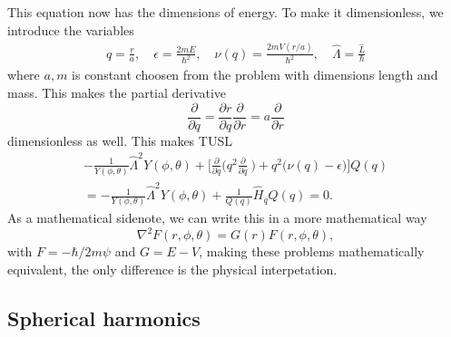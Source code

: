 \documentclass{article}
\begin{document}
        This equation now has the dimensions of energy. To make it dimensionless, we introduce the variables
        \begin{align*}
            q = \frac{r}{a}, \quad \epsilon = \frac{2mE}{\hbar^2}, \quad \nu(q) = \frac{2mV(r / a)}{\hbar^2}, \quad \hat \Lambda = \frac{\hat L}{\hbar} 
        \end{align*}
        where \(a, m\) is constant choosen from the problem with dimensions length and mass. This makes the partial derivative
        \begin{equation*}
            \frac{\partial}{\partial q} = \frac{\partial r}{\partial q} \frac{\partial}{\partial r} = a \frac{\partial }{\partial r}
        \end{equation*}
        dimensionless as well. This makes TUSL
        \begin{align}
            \label{dimensionless TUSL}
            \nonumber -\frac{1}{Y(\phi, \theta)}{\hat \Lambda}^2 Y(\phi, \theta) + \bigg[\frac{\partial}{\partial q}\bigg(q^2 \frac{\partial}{\partial q}\ \bigg) + q^2 \big(\nu(q) - \epsilon \big) \bigg] Q(q) \\
            = -\frac{1}{Y(\phi, \theta)}{\hat \Lambda}^2 Y(\phi, \theta) + \frac{1}{Q(q)}\hat H_q Q(q)  = 0.
        \end{align}
        As a mathematical sidenote, we can write this in a more mathematical way
        \begin{equation*}
            \nabla^2 F(r, \phi, \theta) = G(r) F(r, \phi, \theta),
        \end{equation*}
        with \(F = - \hbar /2m \psi\) and \(G = E - V\), making these problems mathematically equivalent, the only difference is the physical interpetation.

    \subsection*{Spherical harmonics}
\end{document}
